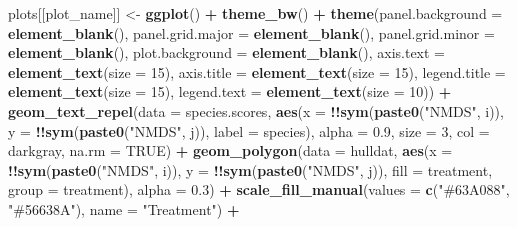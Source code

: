 \documentclass[
]{article}
\newenvironment{Shaded}{\begin{snugshade}}{\end{snugshade}}
\newcommand{\AttributeTok}[1]{\textcolor[rgb]{0.13,0.29,0.53}{#1}}
\newcommand{\ConstantTok}[1]{\textcolor[rgb]{0.56,0.35,0.01}{#1}}
\newcommand{\DecValTok}[1]{\textcolor[rgb]{0.00,0.00,0.81}{#1}}
\newcommand{\FloatTok}[1]{\textcolor[rgb]{0.00,0.00,0.81}{#1}}
\newcommand{\FunctionTok}[1]{\textcolor[rgb]{0.13,0.29,0.53}{\textbf{#1}}}
\newcommand{\NormalTok}[1]{#1}
\newcommand{\OtherTok}[1]{\textcolor[rgb]{0.56,0.35,0.01}{#1}}
\newcommand{\SpecialCharTok}[1]{\textcolor[rgb]{0.81,0.36,0.00}{\textbf{#1}}}
\newcommand{\StringTok}[1]{\textcolor[rgb]{0.31,0.60,0.02}{#1}}
\begin{document}
\begin{Shaded}
\begin{Highlighting}[]
\NormalTok{      plots[[plot\_name]] }\OtherTok{\textless{}{-}} \FunctionTok{ggplot}\NormalTok{() }\SpecialCharTok{+}
        \FunctionTok{theme\_bw}\NormalTok{() }\SpecialCharTok{+}
        \FunctionTok{theme}\NormalTok{(}\AttributeTok{panel.background =} \FunctionTok{element\_blank}\NormalTok{(),}
              \AttributeTok{panel.grid.major =} \FunctionTok{element\_blank}\NormalTok{(),}
              \AttributeTok{panel.grid.minor =} \FunctionTok{element\_blank}\NormalTok{(),}
              \AttributeTok{plot.background =} \FunctionTok{element\_blank}\NormalTok{(),}
              \AttributeTok{axis.text =} \FunctionTok{element\_text}\NormalTok{(}\AttributeTok{size =} \DecValTok{15}\NormalTok{),}
              \AttributeTok{axis.title =} \FunctionTok{element\_text}\NormalTok{(}\AttributeTok{size =} \DecValTok{15}\NormalTok{),}
              \AttributeTok{legend.title =} \FunctionTok{element\_text}\NormalTok{(}\AttributeTok{size =} \DecValTok{15}\NormalTok{),}
              \AttributeTok{legend.text =} \FunctionTok{element\_text}\NormalTok{(}\AttributeTok{size =} \DecValTok{10}\NormalTok{)) }\SpecialCharTok{+}
        \FunctionTok{geom\_text\_repel}\NormalTok{(}\AttributeTok{data =}\NormalTok{ species.scores, }\FunctionTok{aes}\NormalTok{(}\AttributeTok{x =} \SpecialCharTok{!!}\FunctionTok{sym}\NormalTok{(}\FunctionTok{paste0}\NormalTok{(}\StringTok{"NMDS"}\NormalTok{, i)), }\AttributeTok{y =} \SpecialCharTok{!!}\FunctionTok{sym}\NormalTok{(}\FunctionTok{paste0}\NormalTok{(}\StringTok{"NMDS"}\NormalTok{, j)), }\AttributeTok{label =}\NormalTok{ species), }\AttributeTok{alpha =} \FloatTok{0.9}\NormalTok{, }\AttributeTok{size =} \DecValTok{3}\NormalTok{, }\AttributeTok{col =} \StringTok{\textquotesingle{}darkgray\textquotesingle{}}\NormalTok{, }\AttributeTok{na.rm =} \ConstantTok{TRUE}\NormalTok{) }\SpecialCharTok{+}
        \FunctionTok{geom\_polygon}\NormalTok{(}\AttributeTok{data =}\NormalTok{ hulldat, }\FunctionTok{aes}\NormalTok{(}\AttributeTok{x =} \SpecialCharTok{!!}\FunctionTok{sym}\NormalTok{(}\FunctionTok{paste0}\NormalTok{(}\StringTok{"NMDS"}\NormalTok{, i)), }\AttributeTok{y =} \SpecialCharTok{!!}\FunctionTok{sym}\NormalTok{(}\FunctionTok{paste0}\NormalTok{(}\StringTok{"NMDS"}\NormalTok{, j)), }\AttributeTok{fill =}\NormalTok{ treatment, }\AttributeTok{group =}\NormalTok{ treatment), }\AttributeTok{alpha =} \FloatTok{0.3}\NormalTok{) }\SpecialCharTok{+} \FunctionTok{scale\_fill\_manual}\NormalTok{(}\AttributeTok{values =} \FunctionTok{c}\NormalTok{(}\StringTok{"\#63A088"}\NormalTok{, }\StringTok{"\#56638A"}\NormalTok{), }\AttributeTok{name =} \StringTok{"Treatment"}\NormalTok{) }\SpecialCharTok{+}

\end{Highlighting}
\end{Shaded}
\end{document}
